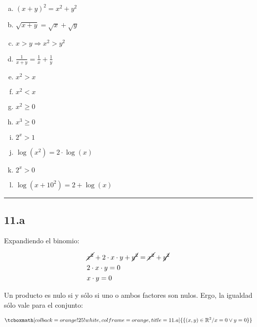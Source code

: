 \documentclass{article}
\newcommand{\hresult}[2]{\tcboxmath[colback=orange!25!white,colframe=orange, title=#1] {#2} }
\begin{document}
\begin{enumerate}[(a)]
\bfseries

\item $ (x+y)^2 = x^2 + y^2 $

\item $ \sqrt{x + y} = \sqrt{x} + \sqrt{y} $

\item $ x > y \Rightarrow x^2 > y^2 $

\item $ \frac{1}{x+y} = \frac{1}{x} + \frac{1}{y} $

\item $ x^2 > x $

\item $ x^2 < x $

\item $ x^2 \geq 0 $

\item $ x^3 \geq 0 $

\item $ 2^x > 1 $

\item $ \log(x^2) = 2 \cdot \log(x) $

\item $ 2^x > 0 $

\item $ \log(x + 10^2) = 2 + \log(x) $

\end{enumerate}
\hrule

\subsection*{11.a}
\label{subsec:11.a}

Expandiendo el binomio:

\begin{subequations}
\begin{align}
& \cancel{x^2} + 2 \cdot x \cdot y + \cancel{y^2} = \cancel{x^2} + \cancel{y^2} \\
& 2 \cdot x \cdot y = 0 \\
& x \cdot y = 0
\end{align}
\end{subequations}

Un producto es nulo si y sólo si uno o ambos factores son nulos. Ergo, la igualdad sólo vale para el conjunto:

\begin{equation}
\hresult{11.a}{ \{ (x,y) \in \mathbb{R}^2 / x = 0 \vee y = 0 \} }
\end{equation}
\end{document}
